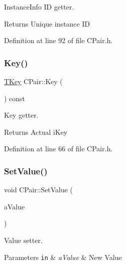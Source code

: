 Instance\+Info ID getter. 

\begin{DoxyReturn}{Returns}
Unique instance ID 
\end{DoxyReturn}


Definition at line 92 of file C\+Pair.\+h.

\mbox{\label{class_c_pair_adf7d1223204fb81086556ece353957cc}} 
\subsubsection{\texorpdfstring{Key()}{Key()}}
{\footnotesize\ttfamily \hyperlink{class_c_pair_a9030f3ef2a07301c105bdf17620ae66a}{T\+Key} C\+Pair\+::\+Key (\begin{DoxyParamCaption}{ }\end{DoxyParamCaption}) const\hspace{0.3cm}{\ttfamily [inline]}}



Key getter. 

\begin{DoxyReturn}{Returns}
Actual {\ttfamily i\+Key} 
\end{DoxyReturn}


Definition at line 66 of file C\+Pair.\+h.

\mbox{\label{class_c_pair_ab09ffc8f30f7ab38d638d9fab3dcc14b}} 
\subsubsection{\texorpdfstring{Set\+Value()}{SetValue()}}
{\footnotesize\ttfamily void C\+Pair\+::\+Set\+Value (\begin{DoxyParamCaption}\item[{const \hyperlink{class_c_value___t_student_1_1_c_value}{C\+Value} \&}]{a\+Value }\end{DoxyParamCaption})\hspace{0.3cm}{\ttfamily [inline]}}



Value setter. 


\begin{DoxyParams}[1]{Parameters}
\mbox{\tt in}  & {\em a\+Value} & New Value \\
\hline
\end{DoxyParams}


